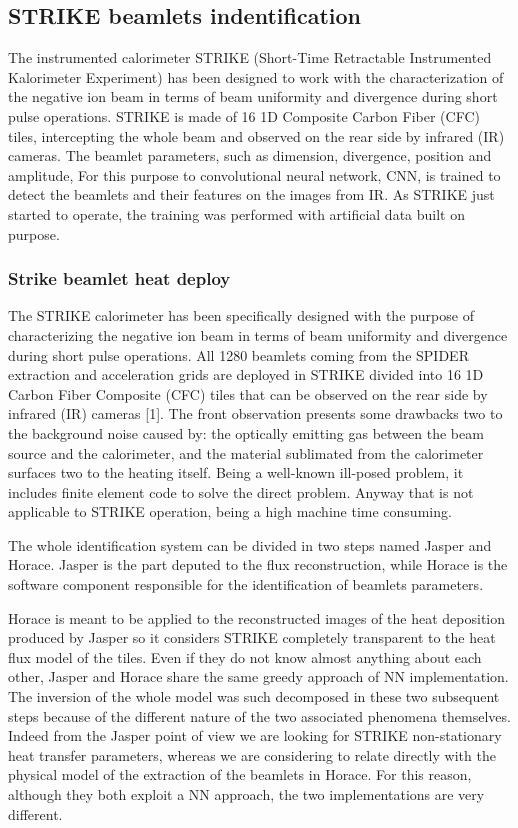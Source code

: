 \subsection{STRIKE beamlets indentification}
\label{section:Horace}
The instrumented calorimeter STRIKE (Short-Time Retractable Instrumented Kalorimeter Experiment) has been designed to work with the characterization of the negative ion beam in terms of beam uniformity and divergence during short pulse operations. STRIKE is made of 16 1D Composite Carbon Fiber (CFC) tiles, intercepting the whole beam and observed on the rear side by infrared (IR) cameras.
The beamlet parameters, such as dimension, divergence, position and amplitude, For this purpose to convolutional neural network, CNN, is trained to detect the beamlets and their features on the images from IR. As STRIKE just started to operate, the training was performed with artificial data built on purpose.

\subsubsection{Strike beamlet heat deploy}
The STRIKE calorimeter has been specifically designed with the purpose of characterizing the negative ion beam in terms of beam uniformity and divergence during short pulse operations. All 1280 beamlets coming from the SPIDER extraction and acceleration grids are deployed in STRIKE divided into 16 1D Carbon Fiber Composite (CFC) tiles that can be observed on the rear side by infrared (IR) cameras [1]. The front observation presents some drawbacks two to the background noise caused by: the optically emitting gas between the beam source and the calorimeter, and the material sublimated from the calorimeter surfaces two to the heating itself.
Being a well-known ill-posed problem, it includes finite element code to solve the direct problem. Anyway that is not applicable to STRIKE operation, being a high machine time consuming. 

The whole identification system can be divided in two steps named Jasper and Horace. Jasper is the part deputed to the flux reconstruction, while Horace is the software component responsible for the identification of beamlets parameters.

Horace is meant to be applied to the reconstructed images of the heat deposition produced by Jasper so it considers STRIKE completely transparent to the heat flux model of the tiles. Even if they do not know almost anything about each other, Jasper and Horace share the same greedy approach of NN implementation. 
The inversion of the whole model was such decomposed in these two subsequent steps because of the different nature of the two associated phenomena themselves. Indeed from the Jasper point of view we are looking for STRIKE non-stationary heat transfer parameters, whereas we are considering to relate directly with the physical model of the extraction of the beamlets in Horace. For this reason, although they both exploit a NN approach, the two implementations are very different.

